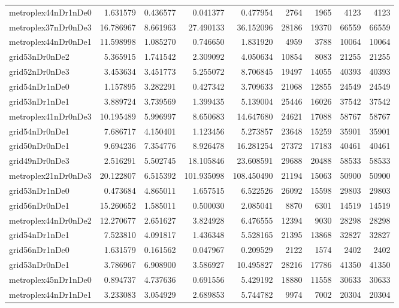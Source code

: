 \begin{longtable}{|l|r|r|r|r|r|r|r|r|}
metroplex44nDr1nDe0 & 1.631579 & 0.436577 & 0.041377 & 0.477954 & 2764 & 1965 & 4123 & 4123 \\
metroplex37nDr0nDe3 & 16.786967 & 8.661963 & 27.490133 & 36.152096 & 28186 & 19370 & 66559 & 66559 \\
metroplex44nDr0nDe1 & 11.598998 & 1.085270 & 0.746650 & 1.831920 & 4959 & 3788 & 10064 & 10064 \\
grid53nDr0nDe2 & 5.365915 & 1.741542 & 2.309092 & 4.050634 & 10854 & 8083 & 21255 & 21255 \\
grid52nDr0nDe3 & 3.453634 & 3.451773 & 5.255072 & 8.706845 & 19497 & 14055 & 40393 & 40393 \\
grid54nDr1nDe0 & 1.157895 & 3.282291 & 0.427342 & 3.709633 & 21068 & 12855 & 24549 & 24549 \\
grid53nDr1nDe1 & 3.889724 & 3.739569 & 1.399435 & 5.139004 & 25446 & 16026 & 37542 & 37542 \\
metroplex41nDr0nDe3 & 10.195489 & 5.996997 & 8.650683 & 14.647680 & 24621 & 17088 & 58767 & 58767 \\
grid54nDr0nDe1 & 7.686717 & 4.150401 & 1.123456 & 5.273857 & 23648 & 15259 & 35901 & 35901 \\
grid50nDr0nDe1 & 9.694236 & 7.354776 & 8.926478 & 16.281254 & 27372 & 17183 & 40461 & 40461 \\
grid49nDr0nDe3 & 2.516291 & 5.502745 & 18.105846 & 23.608591 & 29688 & 20488 & 58533 & 58533 \\
metroplex21nDr0nDe3 & 20.122807 & 6.515392 & 101.935098 & 108.450490 & 21194 & 15063 & 50900 & 50900 \\
grid53nDr1nDe0 & 0.473684 & 4.865011 & 1.657515 & 6.522526 & 26092 & 15598 & 29803 & 29803 \\
grid56nDr0nDe1 & 15.260652 & 1.585011 & 0.500030 & 2.085041 & 8870 & 6301 & 14519 & 14519 \\
metroplex44nDr0nDe2 & 12.270677 & 2.651627 & 3.824928 & 6.476555 & 12394 & 9030 & 28298 & 28298 \\
grid54nDr1nDe1 & 7.523810 & 4.091817 & 1.436348 & 5.528165 & 21395 & 13868 & 32827 & 32827 \\
grid56nDr1nDe0 & 1.631579 & 0.161562 & 0.047967 & 0.209529 & 2122 & 1574 & 2402 & 2402 \\
grid53nDr0nDe1 & 3.786967 & 6.908900 & 3.586927 & 10.495827 & 28216 & 17786 & 41350 & 41350 \\
metroplex45nDr1nDe0 & 0.894737 & 4.737636 & 0.691556 & 5.429192 & 18880 & 11558 & 30633 & 30633 \\
metroplex44nDr1nDe1 & 3.233083 & 3.054929 & 2.689853 & 5.744782 & 9974 & 7002 & 20304 & 20304 \\

\end{longtable}

